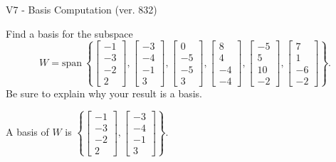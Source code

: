 \begin{exercise}
  \begin{exerciseTitle}V7 - Basis Computation (ver. 832)\end{exerciseTitle}
  \begin{exerciseStatement}
    Find a basis for the subspace 
\[W=\mathrm{span}\ \left\{\left[\begin{array}{r}
-1 \\
-3 \\
-2 \\
2
\end{array}\right] , \left[\begin{array}{r}
-3 \\
-4 \\
-1 \\
3
\end{array}\right] , \left[\begin{array}{r}
0 \\
-5 \\
-5 \\
3
\end{array}\right] , \left[\begin{array}{r}
8 \\
4 \\
-4 \\
-4
\end{array}\right] , \left[\begin{array}{r}
-5 \\
5 \\
10 \\
-2
\end{array}\right] , \left[\begin{array}{r}
7 \\
1 \\
-6 \\
-2
\end{array}\right]\right\}.\]
 Be sure to explain why your result is a basis.


  \end{exerciseStatement}
  \begin{exerciseAnswer}
   A basis of \(W\) is  \(\left\{\left[\begin{array}{r}
-1 \\
-3 \\
-2 \\
2
\end{array}\right] , \left[\begin{array}{r}
-3 \\
-4 \\
-1 \\
3
\end{array}\right]\right\}\).
  


  \end{exerciseAnswer}
\end{exercise}